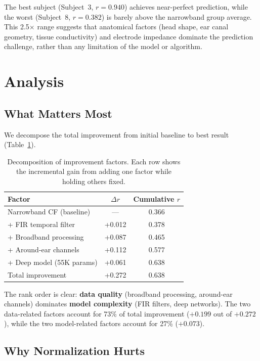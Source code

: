 \documentclass[conference]{IEEEtran}
\begin{document}
The best subject (Subject~3, $r = 0.940$) achieves near-perfect prediction, while the worst (Subject~8, $r = 0.382$) is barely above the narrowband group average. This 2.5$\times$ range suggests that anatomical factors (head shape, ear canal geometry, tissue conductivity) and electrode impedance dominate the prediction challenge, rather than any limitation of the model or algorithm.

\section{Analysis}
\label{sec:analysis}

\subsection{What Matters Most}

We decompose the total improvement from initial baseline to best result (Table~\ref{tab:decomposition}).

\begin{table}[t]
\centering
\caption{Decomposition of improvement factors. Each row shows the incremental gain from adding one factor while holding others fixed.}
\label{tab:decomposition}
\begin{tabular}{@{}lcc@{}}
\toprule
Factor & $\Delta r$ & Cumulative $r$ \\
\midrule
Narrowband CF (baseline) & --- & 0.366 \\
+ FIR temporal filter & +0.012 & 0.378 \\
+ Broadband processing & +0.087 & 0.465 \\
+ Around-ear channels & +0.112 & 0.577 \\
+ Deep model (55K params) & +0.061 & 0.638 \\
\midrule
Total improvement & +0.272 & 0.638 \\
\bottomrule
\end{tabular}
\end{table}

The rank order is clear: \textbf{data quality} (broadband processing, around-ear channels) dominates \textbf{model complexity} (FIR filters, deep networks). The two data-related factors account for 73\% of total improvement ($+0.199$ out of $+0.272$), while the two model-related factors account for 27\% ($+0.073$).

\subsection{Why Normalization Hurts}
\end{document}
